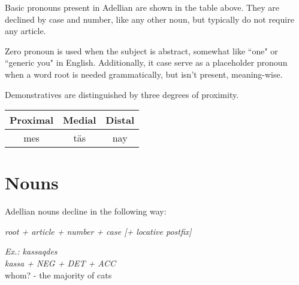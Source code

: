 \documentclass[12pt]{article}
\newcommand{\example}[3]{
	\colorbox{light-gray}{
		\parbox{5in}{
			\emph{Ex.: #1}\\
				  \emph{#2}\\
				  #3
		  }
	}
}
\begin{document}
	Basic pronouns present in Adellian are shown in the table above. They are declined by case and number, like any other noun, but typically do not require any article.
	
	Zero pronoun is used when the subject is abstract, somewhat like ``one" or ``generic you" in English. Additionally, it case serve as a placeholder pronoun when a word root is needed grammatically, but isn't present, meaning-wise.

	Demonstratives are distinguished by three degrees of proximity.

	\begin{tabular}{|| c | c | c ||}
		\hline
		Proximal & Medial & Distal \\
		\hline
		mes & täs &  nay \\
		\hline
	\end{tabular}

	\section{Nouns}
	
	Adellian nouns decline in the following way:
	
	\emph{root + article + number + case [+ locative postfix]}
	
	\example {kassaqdes}
			 {kassa + NEG + DET + ACC}
		 	 {whom? - the majority of cats}
	
\end{document}
